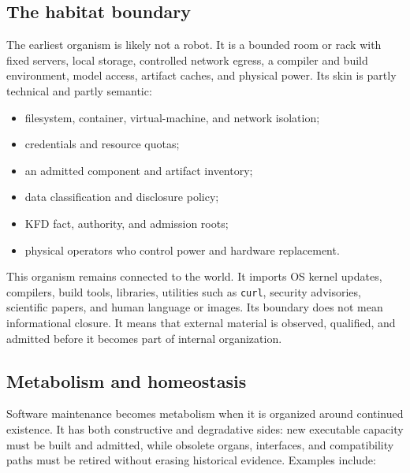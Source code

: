 \subsection{The habitat boundary}

The earliest organism is likely not a robot. It is a bounded room or rack with
fixed servers, local storage, controlled network egress, a compiler and build
environment, model access, artifact caches, and physical power. Its skin is
partly technical and partly semantic:

\begin{itemize}[leftmargin=*]
  \item filesystem, container, virtual-machine, and network isolation;
  \item credentials and resource quotas;
  \item an admitted component and artifact inventory;
  \item data classification and disclosure policy;
  \item KFD fact, authority, and admission roots;
  \item physical operators who control power and hardware replacement.
\end{itemize}

This organism remains connected to the world. It imports OS kernel updates,
compilers, build tools, libraries, utilities such as \texttt{curl}, security
advisories, scientific papers, and human language or images. Its boundary does
not mean informational closure. It means that external material is observed,
qualified, and admitted before it becomes part of internal organization.

\subsection{Metabolism and homeostasis}

Software maintenance becomes metabolism when it is organized around continued
existence. It has both constructive and degradative sides: new executable
capacity must be built and admitted, while obsolete organs, interfaces, and
compatibility paths must be retired without erasing historical evidence.
Examples include:

